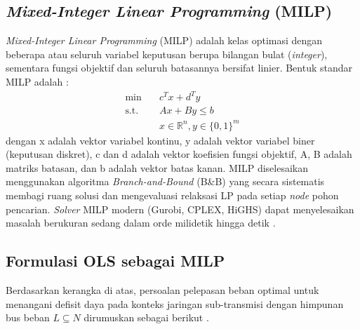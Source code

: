 \subsection{\textit{Mixed-Integer Linear Programming} (MILP)}
\label{subsec:Mixed_Integer_Linear_Programming}

\textit{Mixed-Integer Linear Programming} (MILP) adalah kelas optimasi dengan beberapa atau seluruh variabel keputusan berupa bilangan bulat (\textit{integer}), sementara fungsi objektif dan seluruh batasannya bersifat linier. Bentuk standar MILP adalah \cite{Wolsey2021}:
\begin{equation}
\begin{aligned}
    \min \quad & c^{T}x+d^{T}y \\
    \text{s.t.} \quad & Ax+By\le b \\
    & x\in\mathbb{R}^{n}, y\in\{0,1\}^{m}
\end{aligned}
\end{equation}
dengan x adalah vektor variabel kontinu, y adalah vektor variabel biner (keputusan diskret), c dan d adalah vektor koefisien fungsi objektif, A, B adalah matriks batasan, dan b adalah vektor batas kanan. MILP diselesaikan menggunakan algoritma \textit{Branch-and-Bound} (B\&B) yang secara sistematis membagi ruang solusi dan mengevaluasi relaksasi LP pada setiap \textit{node} pohon pencarian. \textit{Solver} MILP modern (Gurobi, CPLEX, HiGHS) dapat menyelesaikan masalah berukuran sedang dalam orde milidetik hingga detik \cite{Wolsey2021, Mohan2020}.

\subsection{Formulasi OLS sebagai MILP}
\label{subsec:Formulasi_OLS_sebagai_MILP}

Berdasarkan kerangka di atas, persoalan pelepasan beban optimal untuk menangani defisit daya pada konteks jaringan sub-transmisi dengan himpunan bus beban $L\subseteq N$ dirumuskan sebagai berikut \cite{Elsaadany2025, Mohan2020}.

